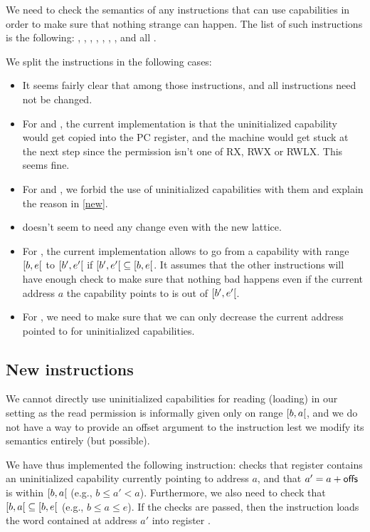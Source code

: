 \documentclass[a4paper, 10pt]{article}
\theoremstyle{remark}
\begin{document}
We need to check the semantics of any instructions that can use capabilities in order to make sure that nothing strange can happen. The list of such instructions is the following: , , , , , , ,  and all .

We split the instructions in the following cases:
\begin{itemize}
  \itemsep0pt
\item It seems fairly clear that among those instructions,  and all  instructions need not be changed.
\item For  and , the current implementation is that the uninitialized capability would get copied into the PC register, and the machine would get stuck at the next step since the permission isn't one of RX, RWX or RWLX. This seems fine.
\item For  and , we forbid the use of uninitialized capabilities with them and explain the reason in \ref{new}.
\item {} doesn't seem to need any change even with the new lattice.
\item For , the current implementation allows to go from a capability with range $\interval[open right]{b}{e}$ to $\interval[open right]{b'}{e'}$ if $\interval[open right]{b'}{e'} \subseteq \interval[open right]{b}{e}$. It assumes that the other instructions will have enough check to make sure that nothing bad happens even if the current address $a$ the capability points to is out of $\interval[open right]{b'}{e'}$.
\item For , we need to make sure that we can only decrease the current address pointed to for uninitialized capabilities.
\end{itemize}

\subsection{\label{new}New instructions}
We cannot directly use uninitialized capabilities for reading (loading) in our setting as the read permission is informally given only on range $\interval[open right]{b}{a}$, and we do not have a way to provide an offset argument to the  instruction lest we modify its semantics entirely (but possible).

We have thus implemented the following instruction: {\color{blue}} checks that register  contains an uninitialized capability currently pointing to address $a$, and that $a' = a + \textsf{offs}$ is within $\interval[open right]{b}{a}$ (e.g., $b \leq a' < a$). Furthermore, we also need to check that $\interval[open right]{b}{a} \subseteq \interval[open right]{b}{e}$ (e.g., $b\leq a\leq e$). If the checks are passed, then the instruction loads the word contained at address $a'$ into register .
\end{document}
